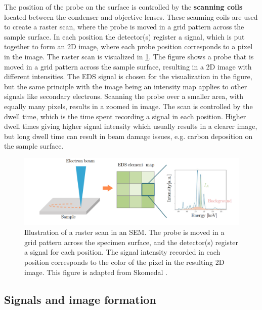 The position of the probe on the surface is controlled by the \textbf{scanning coils} located between the condenser and objective lenses.
These scanning coils are used to create a raster scan, where the probe is moved in a grid pattern across the sample surface.
In each position the detector(s) register a signal, which is put together to form an 2D image, where each probe position corresponds to a pixel in the image.
The raster scan is visualized in \cref{fig:sem_rasterscan}.
The figure shows a probe that is moved in a grid pattern across the sample surface, resulting in a 2D image with different intensities.
The EDS signal is chosen for the visualization in the figure, but the same principle with the image being an intensity map applies to other signals like secondary electrons.
Scanning the probe over a smaller area, with equally many pixels, results in a zoomed in image.
The scan is controlled by the dwell time, which is the time spent recording a signal in each position.
Higher dwell times giving higher signal intensity which usually results in a clearer image, but long dwell time can result in beam damage issues, e.g. carbon deposition on the sample surface.

\begin{figure}[ht]
    \centering
    \includegraphics[width=0.8\linewidth]{figures/SEM_raster.png}
    \caption{
        Illustration of a raster scan in an SEM.
        The probe is moved in a grid pattern across the specimen surface, and the detector(s) register a signal for each position.
        The signal intensity recorded in each position corresponds to the color of the pixel in the resulting 2D image.
        This figure is adapted from Skomedal \cite[Fig. 2.14]{skomedal_improving_2022}.
    }
    \label{fig:sem_rasterscan}
\end{figure}






\subsection{Signals and image formation}
\label{theory:sem:sem_signals}

